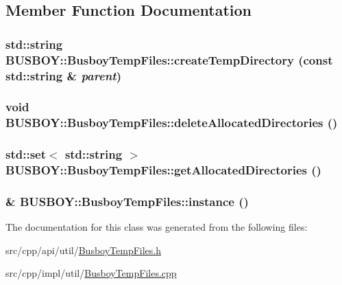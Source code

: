 \subsection{Member Function Documentation}
\hypertarget{classBUSBOY_1_1BusboyTempFiles_a874ff804f268c8baba60a8ee8baed0e4}{
\subsubsection[{createTempDirectory}]{\setlength{\rightskip}{0pt plus 5cm}std::string BUSBOY::BusboyTempFiles::createTempDirectory (const std::string \& {\em parent})}}
\label{classBUSBOY_1_1BusboyTempFiles_a874ff804f268c8baba60a8ee8baed0e4}
\hypertarget{classBUSBOY_1_1BusboyTempFiles_ac103abf22657537c152286291e84c4e0}{
\subsubsection[{deleteAllocatedDirectories}]{\setlength{\rightskip}{0pt plus 5cm}void BUSBOY::BusboyTempFiles::deleteAllocatedDirectories ()}}
\label{classBUSBOY_1_1BusboyTempFiles_ac103abf22657537c152286291e84c4e0}
\hypertarget{classBUSBOY_1_1BusboyTempFiles_a990ce8348a48c0e8991dffdfd35d3cd0}{
\subsubsection[{getAllocatedDirectories}]{\setlength{\rightskip}{0pt plus 5cm}std::set$<$ std::string $>$ BUSBOY::BusboyTempFiles::getAllocatedDirectories ()}}
\label{classBUSBOY_1_1BusboyTempFiles_a990ce8348a48c0e8991dffdfd35d3cd0}
\hypertarget{classBUSBOY_1_1BusboyTempFiles_a030dc3fce222b7aa0903c11f4850c4ea}{
\subsubsection[{instance}]{ \& BUSBOY::BusboyTempFiles::instance ()}}
\label{classBUSBOY_1_1BusboyTempFiles_a030dc3fce222b7aa0903c11f4850c4ea}


The documentation for this class was generated from the following files:\begin{DoxyCompactItemize}
\item 
src/cpp/api/util/\hyperlink{BusboyTempFiles_8h}{BusboyTempFiles.h}\item 
src/cpp/impl/util/\hyperlink{BusboyTempFiles_8cpp}{BusboyTempFiles.cpp}\end{DoxyCompactItemize}
